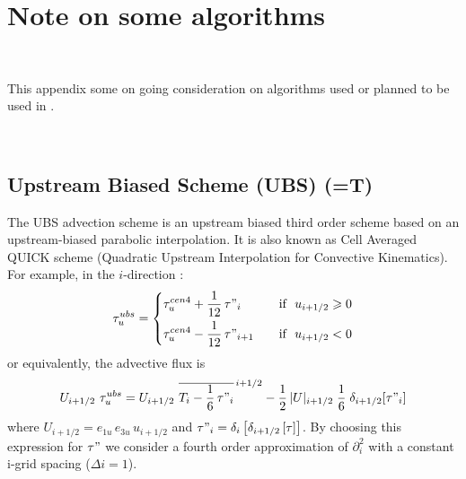 \chapter{Note on some algorithms}
\label{Apdx_E}
\minitoc

\newpage
$\ $\newline    %
 
 This appendix some on going consideration on algorithms used or planned to be used
in \NEMO. 

$\ $\newline    %

\section{Upstream Biased Scheme (UBS) (=T)}
\label{TRA_adv_ubs}

The UBS advection scheme is an upstream biased third order scheme based on 
an upstream-biased parabolic interpolation. It is also known as Cell Averaged 
QUICK scheme (Quadratic Upstream Interpolation for Convective 
Kinematics). For example, in the $i$-direction :
\begin{equation} \label{Eq_tra_adv_ubs2}
\tau _u^{ubs} = \left\{	 \begin{aligned}
  & \tau _u^{cen4} + \frac{1}{12} \,\tau"_i	   & \quad \text{if }\ u_{i+1/2} \geqslant 0 \\
  & \tau _u^{cen4} - \frac{1}{12} \,\tau"_{i+1} & \quad \text{if }\ u_{i+1/2}       <       0
  						 \end{aligned}    \right.
\end{equation}
or equivalently, the advective flux is
\begin{equation} \label{Eq_tra_adv_ubs2}
U_{i+1/2} \ \tau _u^{ubs} 
=U_{i+1/2} \ \overline{ T_i - \frac{1}{6}\,\tau"_i }^{\,i+1/2}
- \frac{1}{2}\, |U|_{i+1/2} \;\frac{1}{6} \;\delta_{i+1/2}[\tau"_i]
\end{equation}
where $U_{i+1/2} = e_{1u}\,e_{3u}\,u_{i+1/2}$ and 
$\tau "_i =\delta _i \left[ {\delta _{i+1/2} \left[ \tau \right]} \right]$. 
By choosing this expression for $\tau "$ we consider a fourth order approximation 
of $\partial_i^2$ with a constant i-grid spacing ($\Delta i=1$). 

